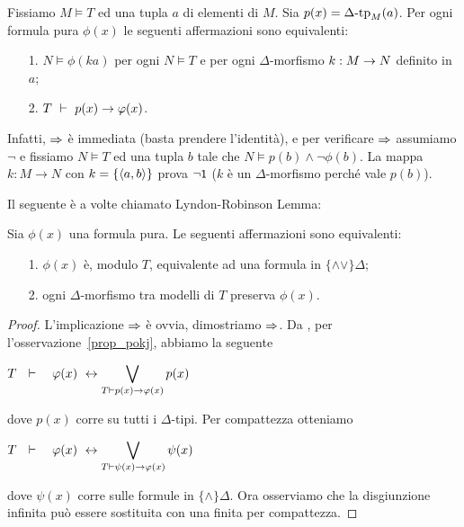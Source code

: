 \begin{remark}\label{prop_pokj}
Fissiamo $M\models T$ ed una tupla $a$ di elementi di $M$. Sia $p(x)=\Delta\mbox{-}\textrm{tp}_M(a)$. Per ogni formula pura $\phi(x)$ le seguenti affermazioni sono equivalenti:
\begin{itemize}
\item[1.] $N\models\phi(ka)$ per ogni $N\models T$ e per ogni $\Delta$-morfismo $k:M\rightarrow N$ definito in $a$;
\item[2.] $T\ \proves\  p(x)\imp\phi(x)$.
\end{itemize}
Infatti, $\Rightarrow$ \`e immediata (basta prendere l'identit\`a), e per verificare $\Rightarrow$ 
assumiamo $\neg$ e fissiamo $N\models T$ ed una tupla $b$ tale che $N\models p(b)\wedge\neg\phi(b)$. La mappa $k:M\to N$ con $k=\{\langle a,b\rangle\}$ prova $\neg\textsf{\small 1}$ ($k$ \`e un $\Delta$-morfismo perch\'e vale $p(b)$).\QED
\end{remark}

Il seguente \`e a volte chiamato Lyndon-Robinson Lemma: 

\begin{theorem}\label{qfdefinability}
Sia $\phi(x)$ una formula pura. Le seguenti affermazioni sono equivalenti:
\begin{itemize}
\item[1.] $\phi(x)$ \`e, modulo $T$, equivalente ad una formula in $\{\mathord\wedge\!\mathord\vee\}\Delta$;
\item[2.] ogni $\Delta$-morfismo tra modelli di $T$ preserva $\phi(x)$.
\end{itemize}
\end{theorem}
\begin{proof} L'implicazione $\Rightarrow$ \`e ovvia, dimostriamo $\Rightarrow$. Da , per l'osservazione~\ref{prop_pokj}, abbiamo la seguente

\hfil$\displaystyle T\ \ \proves\ \ \ \phi(x)\ \iff\bigvee_{T\proves p(x)\imp\phi(x)} p(x)$

dove $p(x)$ corre su tutti i $\Delta$-tipi. Per compattezza otteniamo

\hfil$\displaystyle T\ \ \proves\ \ \ \phi(x)\ \iff\bigvee_{T\proves\psi(x)\imp\phi(x)} \psi(x)$

dove $\psi(x)$ corre sulle formule in $\{\wedge\}\Delta$. Ora osserviamo che la disgiunzione infinita pu\`o essere sostituita con una finita per compattezza.
\end{proof}
















